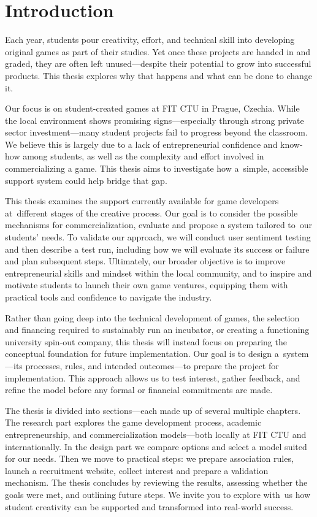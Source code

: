 \chapter*{Introduction}
Each year, students pour creativity, effort, and technical skill into developing original games as part of their studies. Yet once these projects are handed in and graded, they are often left unused---despite their potential to grow into successful products. This thesis explores why that happens and what can be done to change it.

Our focus is on student-created games at FIT CTU in Prague, Czechia. While the local environment shows promising signs---especially through strong private sector investment---many student projects fail to progress beyond the classroom. We believe this is largely due to a lack of entrepreneurial confidence and know-how among students, as well as the complexity and effort involved in commercializing a game. This thesis aims to investigate how a~simple, accessible support system could help bridge that gap.

This thesis examines the support currently available for game developers at~different stages of the creative process. Our goal is to consider the possible mechanisms for commercialization, evaluate and propose a system tailored to~our students’ needs. To validate our approach, we will conduct user sentiment testing and then describe a test run, including how we will evaluate its success or failure and plan subsequent steps. Ultimately, our broader objective is to improve entrepreneurial skills and mindset within the local community, and to inspire and motivate students to launch their own game ventures, equipping them with practical tools and confidence to navigate the industry.

Rather than going deep into the technical development of games, the selection and financing required to sustainably run an incubator, or creating a functioning university spin-out company, this thesis will instead focus on preparing the conceptual foundation for future implementation. Our goal is to design a~system---its processes, rules, and intended outcomes---to prepare the project for implementation. This approach allows us to test interest, gather feedback, and refine the model before any formal or financial commitments are made.

The thesis is divided into sections---each made up of several multiple chapters. The research part explores the game development process, academic entrepreneurship, and commercialization models---both locally at FIT CTU and internationally. In the design part we compare options and select a model suited for our needs. Then we move to practical steps: we prepare association rules, launch a recruitment website, collect interest and prepare a validation mechanism. The thesis concludes by reviewing the results, assessing whether the goals were met, and outlining future steps. We invite you to explore with~us how student creativity can be supported and transformed into real-world success.